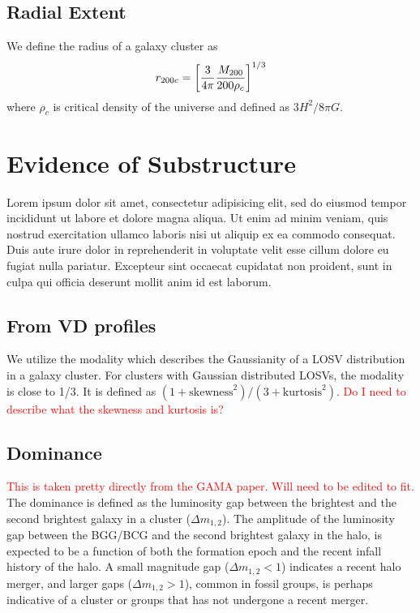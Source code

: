 \documentclass[apj, revtex4]{emulateapj}
\newcommand{\editorial}[1]{\textcolor{red}{#1}}
\begin{document}
\subsection{Radial Extent}
We define the radius of a galaxy cluster as
\begin{equation}
	r_{200c} = \bigg{[} \frac{3}{4\pi} \frac{M_{200}}{200\rho_c} \bigg{]}^{1/3}
\end{equation}
where $\rho_c$ is critical density of the universe and defined as $3H^2/8\pi G$.


\section{Evidence of Substructure}
Lorem ipsum dolor sit amet, consectetur adipisicing elit, sed do eiusmod tempor incididunt ut labore et dolore magna aliqua. Ut enim ad minim veniam, quis nostrud exercitation ullamco laboris nisi ut aliquip ex ea commodo consequat. Duis aute irure dolor in reprehenderit in voluptate velit esse cillum dolore eu fugiat nulla pariatur. Excepteur sint occaecat cupidatat non proident, sunt in culpa qui officia deserunt mollit anim id est laborum.

\subsection{From VD profiles}
We utilize the modality \citep{Oliva-Altamirano2014} which describes the Gaussianity of a LOSV distribution in a galaxy cluster. For clusters with Gaussian distributed LOSVs, the modality is close to 1/3. It is defined as $(1+\mathrm{skewness}^2)/(3+\mathrm{kurtosis}^2)$. \editorial{Do I need to describe what the skewness and kurtosis is?}

\subsection{Dominance}
\editorial{This is taken pretty directly from the GAMA paper. Will need to be edited to fit.}
The dominance is defined as the luminosity gap between the brightest and the second brightest galaxy in a cluster ($\Delta m_{1, 2}$). The amplitude of the luminosity gap between the BGG/BCG and the second brightest galaxy in the halo, is expected to be a function of both the formation epoch and the recent infall history of the halo. A small magnitude gap ($\Delta m_{1, 2} < 1$) indicates a recent halo merger, and larger gaps ($\Delta m_{1, 2} > 1$), common in fossil groups, is perhaps indicative of a cluster or groups that has not undergone a recent merger.
\end{document}
